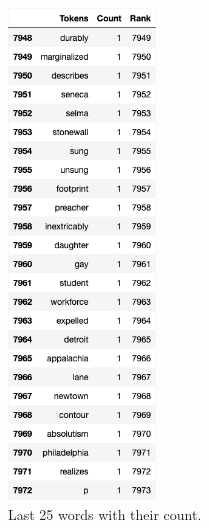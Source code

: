 \documentclass[titlepage]{article}
\begin{document}
\begin{figure}[H]
    \centering
    \includegraphics[width=0.35\textwidth]{figures/df_last25.png}
    \caption{Last 25 words with their count.}
    \label{fig:FigLast25}
\end{figure}
\end{document}
